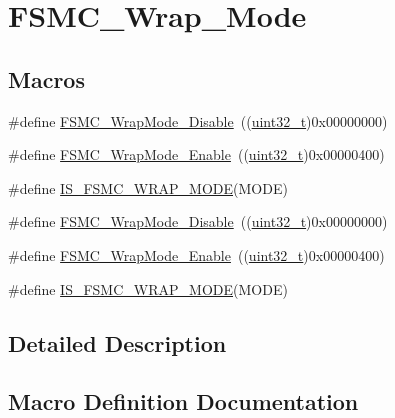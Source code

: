\hypertarget{group___f_s_m_c___wrap___mode}{}\section{F\+S\+M\+C\+\_\+\+Wrap\+\_\+\+Mode}
\label{group___f_s_m_c___wrap___mode}
\subsection*{Macros}
\begin{DoxyCompactItemize}
\item 
\#define \hyperlink{group___f_s_m_c___wrap___mode_ga6041f0d3055ea3811a5a19560092f266}{F\+S\+M\+C\+\_\+\+Wrap\+Mode\+\_\+\+Disable}~((\hyperlink{_p_e___types_8h_a33594304e786b158f3fb30289278f5af}{uint32\+\_\+t})0x00000000)
\item 
\#define \hyperlink{group___f_s_m_c___wrap___mode_gad07eb0ae0362b2f94071d0dab6473fda}{F\+S\+M\+C\+\_\+\+Wrap\+Mode\+\_\+\+Enable}~((\hyperlink{_p_e___types_8h_a33594304e786b158f3fb30289278f5af}{uint32\+\_\+t})0x00000400)
\item 
\#define \hyperlink{group___f_s_m_c___wrap___mode_ga0751d74b7fb1e17f6cedea091e8ebfc8}{I\+S\+\_\+\+F\+S\+M\+C\+\_\+\+W\+R\+A\+P\+\_\+\+M\+O\+DE}(M\+O\+DE)
\item 
\#define \hyperlink{group___f_s_m_c___wrap___mode_ga6041f0d3055ea3811a5a19560092f266}{F\+S\+M\+C\+\_\+\+Wrap\+Mode\+\_\+\+Disable}~((\hyperlink{_p_e___types_8h_a33594304e786b158f3fb30289278f5af}{uint32\+\_\+t})0x00000000)
\item 
\#define \hyperlink{group___f_s_m_c___wrap___mode_gad07eb0ae0362b2f94071d0dab6473fda}{F\+S\+M\+C\+\_\+\+Wrap\+Mode\+\_\+\+Enable}~((\hyperlink{_p_e___types_8h_a33594304e786b158f3fb30289278f5af}{uint32\+\_\+t})0x00000400)
\item 
\#define \hyperlink{group___f_s_m_c___wrap___mode_ga0751d74b7fb1e17f6cedea091e8ebfc8}{I\+S\+\_\+\+F\+S\+M\+C\+\_\+\+W\+R\+A\+P\+\_\+\+M\+O\+DE}(M\+O\+DE)
\end{DoxyCompactItemize}


\subsection{Detailed Description}


\subsection{Macro Definition Documentation}
